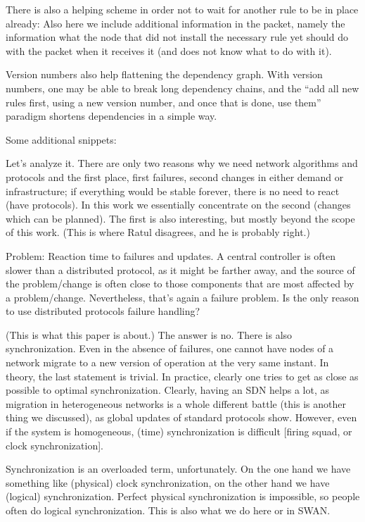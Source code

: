 There is also a helping scheme in order not to wait for another rule to be in place already: Also here we include additional information in the packet, namely the information what the node that did not install the necessary rule yet should do with the packet when it receives it (and does not know what to do with it). 

Version numbers also help flattening the dependency graph. With version numbers, one may be able to break long dependency chains, and the ``add all new rules first, using a new version number, and once that is done, use them'' paradigm shortens dependencies in a simple way.




Some additional snippets:

Let’s analyze it. There are only two reasons why we need network algorithms and protocols and the first place, first failures, second changes in either demand or infrastructure; if everything would be stable forever, there is no need to react (have protocols). In this work we essentially concentrate on the second (changes which can be planned). The first is also interesting, but mostly beyond the scope of this work. (This is where Ratul disagrees, and he is probably right.)

Problem: Reaction time to failures and updates. A central controller is often slower than a distributed protocol, as it might be farther away, and the source of the problem/change is often close to those components that are most affected by a problem/change. Nevertheless, that’s again a failure problem. Is the only reason to use distributed protocols failure handling?

(This is what this paper is about.) The answer is no. There is also synchronization. Even in the absence of failures, one cannot have nodes of a network migrate to a new version of operation at the very same instant. In theory, the last statement is trivial. In practice, clearly one tries to get as close as possible to optimal synchronization. Clearly, having an SDN helps a lot, as migration in heterogeneous networks is a whole different battle (this is another thing we discussed), as global updates of standard protocols show. However, even if the system is homogeneous, (time) synchronization is difficult [firing squad, or clock synchronization].

Synchronization is an overloaded term, unfortunately. On the one hand we have something like (physical) clock synchronization, on the other hand we have (logical) synchronization. Perfect physical synchronization is impossible, so people often do logical synchronization. This is also what we do here or in SWAN.

